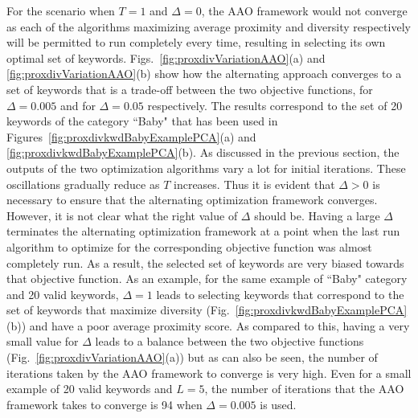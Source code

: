 For the scenario when $T=1$ and $\Delta=0$, the AAO framework would not converge as each of the algorithms maximizing average proximity and diversity respectively will be permitted to run completely every time,  resulting in selecting its own optimal set of keywords. Figs.~\ref{fig:proxdivVariationAAO}(a) and \ref{fig:proxdivVariationAAO}(b) show how the alternating approach converges to a set of keywords that is a trade-off between the two objective functions, for $\Delta=0.005$ and for $\Delta=0.05$ respectively. The results correspond to the set of 20 keywords of the category ``Baby" that has been used in Figures~\ref{fig:proxdivkwdBabyExamplePCA}(a) and \ref{fig:proxdivkwdBabyExamplePCA}(b). As discussed in the previous section, the outputs of the two optimization algorithms vary a lot for initial iterations. These oscillations gradually reduce as $T$ increases. Thus it is evident that $\Delta >0$ is necessary to ensure that the alternating optimization framework converges. However, it is not clear what the right value of $\Delta$ should be. Having a large $\Delta$ terminates the alternating optimization framework at a point when the last run algorithm to optimize for the corresponding objective function was almost completely run. As a result, the selected set of keywords are very biased towards that objective function. As an example, for the same example of ``Baby" category and 20 valid keywords, $\Delta=1$ leads to selecting keywords that correspond to the set of keywords that maximize diversity (Fig.~\ref{fig:proxdivkwdBabyExamplePCA}(b)) and have a poor average proximity score. As compared to this, having a very small value for $\Delta$ leads to a balance between the two objective functions (Fig.~\ref{fig:proxdivVariationAAO}(a)) but as can also be seen, the number of iterations taken by the AAO framework to converge is very high. Even for a small example of 20 valid keywords and $L=5$, the number of iterations that the AAO framework takes to converge is 94 when $\Delta = 0.005$ is used. 

